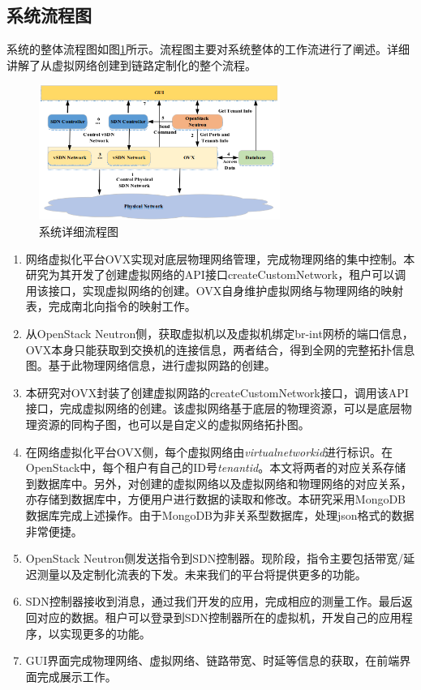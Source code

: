 \subsection{系统流程图}
系统的整体流程图如图\ref{fig:workflow}所示。流程图主要对系统整体的工作流进行了阐述。详细讲解了从虚拟网络创建到链路定制化的整个流程。

\begin{figure}[!htb]
  \centering
  \includegraphics[width=0.7\textwidth]{logo/workflow.png}
  \caption{系统详细流程图}
  \label{fig:workflow}
\end{figure}

\begin{enumerate}
\item 网络虚拟化平台OVX实现对底层物理网络管理，完成物理网络的集中控制。本研究为其开发了创建虚拟网络的API接口createCustomNetwork，租户可以调用该接口，实现虚拟网络的创建。OVX自身维护虚拟网络与物理网络的映射表，完成南北向指令的映射工作。
\item 从OpenStack Neutron侧，获取虚拟机以及虚拟机绑定br-int网桥的端口信息，OVX本身只能获取到交换机的连接信息，两者结合，得到全网的完整拓扑信息图。基于此物理网络信息，进行虚拟网路的创建。
\item 本研究对OVX封装了创建虚拟网路的createCustomNetwork接口，调用该API接口，完成虚拟网络的创建。该虚拟网络基于底层的物理资源，可以是底层物理资源的同构子图，也可以是自定义的虚拟网络拓扑图。
\item 在网络虚拟化平台OVX侧，每个虚拟网络由\emph{virtualnetworkid}进行标识。在OpenStack中，每个租户有自己的ID号\emph{tenantid}。本文将两者的对应关系存储到数据库中。另外，对创建的虚拟网络以及虚拟网络和物理网络的对应关系，亦存储到数据库中，方便用户进行数据的读取和修改。本研究采用MongoDB数据库完成上述操作。由于MongoDB为非关系型数据库，处理json格式的数据非常便捷。
\item OpenStack Neutron侧发送指令到SDN控制器。现阶段，指令主要包括带宽/延迟测量以及定制化流表的下发。未来我们的平台将提供更多的功能。
\item SDN控制器接收到消息，通过我们开发的应用，完成相应的测量工作。最后返回对应的数据。租户可以登录到SDN控制器所在的虚拟机，开发自己的应用程序，以实现更多的功能。
\item GUI界面完成物理网络、虚拟网络、链路带宽、时延等信息的获取，在前端界面完成展示工作。
\end{enumerate}

